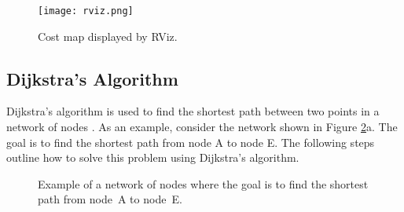 \begin{figure}[!htb]
    \texttt{[image: rviz.png]}
    \centering
    \caption{Cost map displayed by RViz.}
    \label{fig:rviz}
\end{figure}

\filbreak

\subsection{Dijkstra's Algorithm} \label{dijkstra}
Dijkstra's algorithm is used to find the shortest path between two points in a network of nodes \parencite{computerphileDijkstraAlgorithmComputerphile2017}. As an example, consider the network shown in Figure \ref{fig:dijkstra}a. The goal is to find the shortest path from node A to node E. The following steps outline how to solve this problem using Dijkstra's algorithm.

\begin{figure}[htb]
    \centering
    \qquad
    \caption{Example of a network of nodes where the goal is to find the shortest path from node A to node E.}
    \label{fig:dijkstra}
\end{figure}

